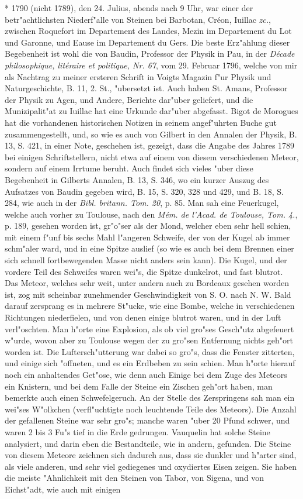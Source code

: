 \documentclass[a4paper, 11pt, oneside, polutonikogreek, german]{article}
\begin{document}
* 1790 (nicht 1789), den 24. Julius, abends nach 9 Uhr, war einer der betr"achtlichsten Niederf"alle von Steinen bei Barbotan, Créon, Iuillac \emph{zc.}, zwischen Roquefort im Departement des Landes, Mezin im Departement du Lot und Garonne, und Eause im Departement du Gers. Die beste Erz"ahlung dieser Begebenheit ist wohl die von Baudin, Professor der Physik in Pau, in der \emph{Décade philosophique, litéraire et politique, Nr. 67}, vom 29. Februar 1796, welche von mir als Nachtrag zu meiner ersteren Schrift in Voigts Magazin f"ur Physik und Naturgeschichte, B. 11, 2. St., "ubersetzt ist. Auch haben St. Amans, Professor der Physik zu Agen, und Andere, Berichte dar"uber geliefert, und die Munizipalit"at zu Iuillac hat eine Urkunde dar"uber abgefasst. Bigot de Morogues hat die vorhandenen historischen Notizen in seinem angef"uhrten Buche gut zusammengestellt, und, so wie es auch von Gilbert in den Annalen der Physik, B. 13, S. 421, in einer Note, geschehen ist, gezeigt, dass die Angabe des Jahres 1789 bei einigen Schriftstellern, nicht etwa auf einem von diesem verschiedenen Meteor, sondern auf einem Irrtume beruht. Auch findet sich vieles "uber diese Begebenheit in Gilberts Annalen, B. 13, S. 346, wo ein kurzer Auszug des Aufsatzes von Baudin gegeben wird, B. 15, S. 320, 328 und 429, und B. 18, S. 284, wie auch in der \emph{Bibl. britann. Tom. 20}, p. 85. Man sah eine Feuerkugel, welche auch vorher zu Toulouse, nach den \emph{Mém. de l'Acad. de Toulouse, Tom. 4.}, p. 189, gesehen worden ist, gr"o"ser als der Mond, welcher eben sehr hell schien, mit einem f"unf bis sechs Mahl l"angeren Schweife, der von der Kugel ab immer schm"aler ward, und in eine Spitze auslief (so wie es auch bei dem Brennen einer sich schnell fortbewegenden Masse nicht anders sein kann). Die Kugel, und der vordere Teil des Schweifes waren wei"s, die Spitze dunkelrot, und fast blutrot. Das Meteor, welches sehr weit, unter andern auch zu Bordeaux gesehen worden ist, zog mit scheinbar zunehmender Geschwindigkeit von S. O. nach N. W. Bald darauf zersprang es in mehrere St"ucke, wie eine Bombe, welche in verschiedenen Richtungen niederfielen, und von denen einige blutrot waren, und in der Luft verl"oschten. Man h"orte eine Explosion, als ob viel gro"ses Gesch"utz abgefeuert w"urde, wovon aber zu Toulouse wegen der zu gro"sen Entfernung nichts geh"ort worden ist. Die Luftersch"utterung war dabei so gro"s, dass die Fenster zitterten, und einige sich "offneten, und es ein Erdbeben zu sein schien. Man h"orte hierauf noch ein anhaltendes Get"ose, wie denn auch Einige bei dem Zuge des Meteors ein Knistern, und bei dem Falle der Steine ein Zischen geh"ort haben, man bemerkte auch einen Schwefelgeruch. An der Stelle des Zerspringens sah man ein wei"ses W"olkchen (verfl"uchtigte noch leuchtende Teile des Meteors). Die Anzahl der gefallenen Steine war sehr gro"s; manche waren "uber 20 Pfund schwer, und waren 2 bis 3 Fu"s tief in die Erde gedrungen. Vauquelin hat solche Steine analysiert, und darin eben die Bestandteile, wie in andern, gefunden. Die Steine von diesem Meteore zeichnen sich dadurch aus, dass sie dunkler und h"arter sind, als viele anderen, und sehr viel gediegenes und oxydiertes Eisen zeigen. Sie haben die meiste "Ahnlichkeit mit den Steinen von Tabor, von Sigena, und von Eichst"adt, wie auch mit einigen 
\end{document}
